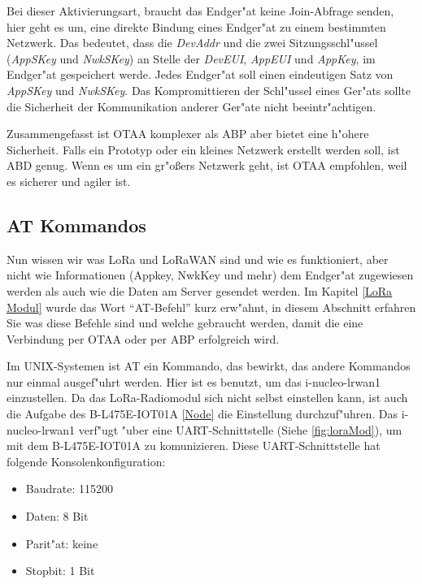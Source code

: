 Bei dieser Aktivierungsart, braucht das Endger"at keine Join-Abfrage 
senden, hier geht es um, eine direkte Bindung eines Endger"at zu einem 
bestimmten Netzwerk. Das bedeutet, dass die \textit{DevAddr} und die 
zwei Sitzungsschl"ussel (\textit{AppSKey} und \textit{NwkSKey}) an 
Stelle der \textit{DevEUI}, \textit{AppEUI} und \textit{AppKey}, im 
Endger"at gespeichert werde. Jedes Endger"at soll einen eindeutigen Satz 
von \textit{AppSKey} und \textit{NwkSKey}. Das Kompromittieren der 
Schl"ussel eines Ger"ats sollte die Sicherheit der Kommunikation anderer 
Ger"ate nicht beeintr"achtigen. 


Zusammengefasst ist OTAA komplexer als ABP aber bietet eine h"ohere 
Sicherheit. Falls ein Prototyp oder ein kleines Netzwerk erstellt werden 
soll, ist ABD genug. Wenn es um ein gr"o\ss{}ers Netzwerk geht, ist OTAA 
empfohlen, weil es sicherer und agiler ist. 

\vspace{5cm}
\subsection{AT Kommandos}\label{AT}

Nun wissen wir was LoRa und LoRaWAN sind und wie es funktioniert, aber 
nicht wie Informationen (Appkey, NwkKey und mehr) dem Endger"at 
zugewiesen werden als auch wie die Daten am Server gesendet werden. 
Im Kapitel \ref{LoRa Modul} wurde das Wort ``AT-Befehl'' kurz erw"ahnt, 
in diesem Abschnitt erfahren Sie was diese Befehle sind und welche 
gebraucht werden, damit die eine Verbindung per OTAA oder per ABP 
erfolgreich wird.

Im UNIX-Systemen ist AT ein Kommando, das bewirkt, das andere Kommandos
nur einmal ausgef"uhrt werden. Hier ist es benutzt, um das
i-nucleo-lrwan1 einzustellen. Da das LoRa-Radiomodul sich nicht selbst
einstellen kann, ist auch die Aufgabe des B-L475E-IOT01A \ref{Node} die 
Einstellung durchzuf"uhren. Das i-nucleo-lrwan1 verf"ugt "uber eine 
UART-Schnittstelle (Siehe \ref{fig:loraMod}), um mit dem B-L475E-IOT01A 
zu komunizieren. Diese UART-Schnittstelle hat folgende 
Konsolenkonfiguration: 

\begin{itemize}
	\item Baudrate: 115200
	\item Daten: 8 Bit
	\item Parit"at: keine
	\item Stopbit: 1 Bit
\end{itemize}           

